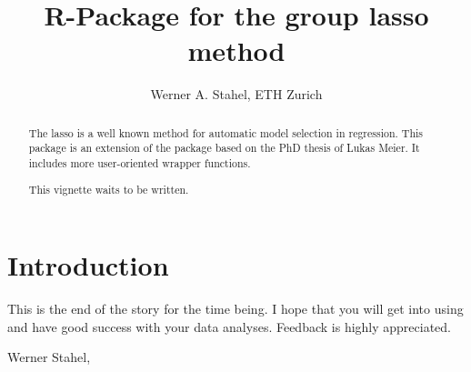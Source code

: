 \documentclass[11pt]{article}
\begin{document}

\baselineskip 15pt

\title{\vspace*{-10mm}
R-Package  for the group lasso  method}
\author{Werner A. Stahel, ETH Zurich}
\maketitle

\begin{abstract}\noindent
  The lasso is a well known method for automatic model selection 
  in regression.
  This package is an extension of the  package based on 
  the PhD thesis of Lukas Meier.
  It includes more user-oriented wrapper functions.
  
  This vignette waits to be written.
\end{abstract}

\section{Introduction}


{\small
This is the end of the story for the time being. I hope that you will
get into using  and have good success with your data analyses.
Feedback is highly appreciated.

Werner Stahel, 
}
\end{document}
